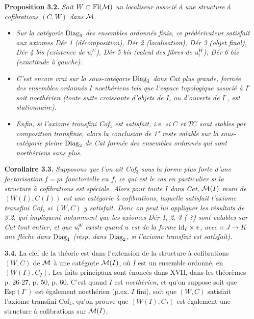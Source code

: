 
\textbf{Proposition 3.2.} \textit{Soit $W\subset\mathrm{Fl}(\mathcal{M})$ un localiseur associé à une structure à cofibrations $(C,W)$ dans $\mathcal{M}$.}
\begin{itemize}[leftmargin=3em,labelwidth=2.5em,align=right]
\item[1°)] \textit{Sur la catégorie \textup{$\mathrm{Diag}_0$} des ensembles ordonnés \textup{finis}, ce prédérivateur satisfait aux axiomes Dér 1 (décomposition), Dér 2 (localisation), Dér 3 (objet final), Dér 4 bis (existence de $u^{W}_{!}$), Dér 5 bis (calcul des fibres de $u^{W}_{!}$), Dér 6 bis (exactitude à gauche).}
\item[2°)] \textit{C'est encore vrai sur la sous-catégorie \textup{$\mathrm{Diag}_1$} dans \textup{Cat} plus grande, formée des ensembles ordonnés $I$ \textup{noethériens} tels que l'espace topologique associé à $I^{\circ}$ soit noethérien (toute suite croissante d'objets de $I$, ou d'ouverts de $I^{\circ}$, est stationnaire).}
\item[3°)] \textit{Enfin, si l'axiome transfini Cof$_4$ est satisfait, i.e. si $C$ et $TC$ sont stables par composition transfinie, alors la conclusion de \textup{1°} reste valable sur la sous-catégorie pleine \textup{$\mathrm{Diag}_2$} de \textup{Cat} formée des ensembles ordonnés qui sont noethériens sans plus.}
\end{itemize}

\textbf{Corollaire 3.3.} \textit{Supposons que l'on ait Cof$_3$ sous la forme plus forte d'une factorisation
$f=pi$ \textup{fonctorielle} en $f$, ce qui est le cas en particulier si la structure à cofibrations est spéciale. Alors pour toute $I$ dans \textup{Cat}, $\mathcal{M}(I)$ muni de $(W(I),C(I))$ est une catégorie à cofibrations, laquelle satisfait l'axiome transfini Cof$_4$ si $(W,C)$ y satisfait. Donc on peut lui appliquer les résultats de \textup{3.2}, qui impliquent notamment que les axiomes Dér 1, 2, 3 ( ?) sont valables sur \textup{Cat} tout entier, et que $u^{W}_{!}$ existe quand $u$ est de la forme $\mathrm{id}_I\times v$, avec $v : J\longrightarrow K$ une flèche dans \textup{$\mathrm{Diag}_1$} (resp. dans \textup{$\mathrm{Diag}_2$}, si l'axiome transfini est satisfait).}

\textbf{3.4.} La clef de la théorie est dans l'extension de la structure à cofibrations $(W,C)$ de $\mathcal{M}$ à une catégorie $\mathcal{M}(I)$, où $I$ est un ensemble ordonné, en $(W(I),C_I)$. Les faits principaux sont énoncés dans XVII, dans les théorèmes p. 26-27, p. 50, p. 60. C'est quand $I$ est \textit{noethérien,} et qu'on suppose soit que $\mathrm{Esp}(I^{\circ})$ est également noethérien (p.ex. $I$ fini), soit que $(W,C)$ satisfait l'axiome transfini Cof$_4$, qu'on prouve que $(W(I),C_I)$ est également une structure à cofibrations sur $\mathcal{M}(I)$.

